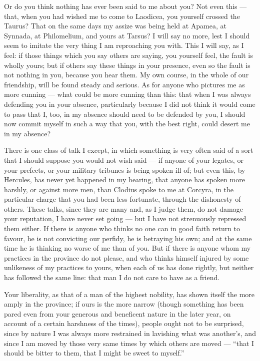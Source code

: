  Or do you think nothing has ever been said to me about you? Not even this --- that, when you had wished me to come to Laodicea, you yourself crossed the Taurus? That on the same days my assize was being held at Apamea, at Synnada, at Philomelium, and yours at Tarsus? I will say no more, lest I should seem to imitate the very thing I am reproaching you with. This I will say, as I feel: if those things which you say others are saying, you yourself feel, the fault is wholly yours; but if others say these things in your presence, even so the fault is not nothing in you, because you hear them. My own course, in the whole of our friendship, will be found steady and serious. As for anyone who pictures me as more cunning --- what could be more cunning than this: that when I was always defending you in your absence, particularly because I did not think it would come to pass that I, too, in my absence should need to be defended by you, I should now commit myself in such a way that you, with the best right, could desert me in my absence?

 There is one class of talk I except, in which something is very often said of a sort that I should suppose you would not wish said --- if anyone of your legates, or your prefects, or your military tribunes is being spoken ill of; but even this, by Hercules, has never yet happened in my hearing, that anyone has spoken more harshly, or against more men, than Clodius spoke to me at Corcyra, in the particular charge that you had been less fortunate, through the dishonesty of others. These talks, since they are many and, as I judge them, do not damage your reputation, I have never set going --- but I have not strenuously repressed them either. If there is anyone who thinks no one can in good faith return to favour, he is not convicting our perfidy, he is betraying his own; and at the same time he is thinking no worse of me than of you. But if there is anyone whom my practices in the province do not please, and who thinks himself injured by some unlikeness of my practices to yours, when each of us has done rightly, but neither has followed the same line: that man I do not care to have as a friend.

 Your liberality, as that of a man of the highest nobility, has shown itself the more amply in the province; if ours is the more narrow (though something has been pared even from your generous and beneficent nature in the later year, on account of a certain harshness of the times), people ought not to be surprised, since by nature I was always more restrained in lavishing what was another's, and since I am moved by those very same times by which others are moved --- ``that I should be bitter to them, that I might be sweet to myself.''

